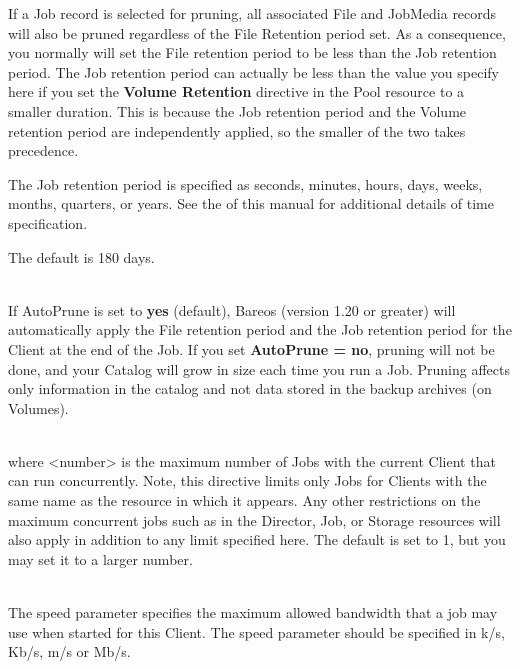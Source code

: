 \begin{description}
If a Job record is selected for pruning, all associated File and JobMedia
records will also be pruned regardless of the File Retention period set.
As a consequence, you normally will set the File retention period to be
less than the Job retention period.  The Job retention period can actually
be less than the value you specify here if you set the {\bf Volume
Retention} directive in the Pool resource to a smaller duration.  This is
because the Job retention period and the Volume retention period are
independently applied, so the smaller of the two takes precedence.

The Job retention period is specified as seconds,  minutes, hours, days,
weeks, months,  quarters, or years.  See the
 of this manual for
additional details of  time specification.

The default is 180 days.

\label{AutoPrune}
\item [AutoPrune = {\textless}yes{\textbar}no{\textgreater}] \hfill \\
If AutoPrune is set to  {\bf yes} (default), Bareos (version 1.20 or greater)
will  automatically apply the File retention period and the Job  retention
period for the Client at the end of the Job.  If you set {\bf AutoPrune = no},
pruning will not be done,  and your Catalog will grow in size each time you
run a Job.  Pruning affects only information in the catalog and not data
stored in the backup archives (on Volumes).

\item [Maximum Concurrent Jobs = {\textless}number{\textgreater}] \hfill \\
where {\textless}number{\textgreater}  is the maximum number of Jobs with the current Client
that  can run concurrently. Note, this directive limits only Jobs  for Clients
with the same name as the resource in which it appears. Any  other
restrictions on the maximum concurrent jobs such as in  the Director, Job, or
Storage resources will also apply in addition to  any limit specified here.
The  default is set to 1, but you may set it to a larger number.

\item [Maximum Bandwidth Per Job = {\textless}speed{\textgreater}] \hfill \\
The speed parameter specifies the maximum allowed bandwidth that a job may use
when started for this Client. The speed parameter should be specified in
k/s, Kb/s, m/s or Mb/s.


\end{description}
